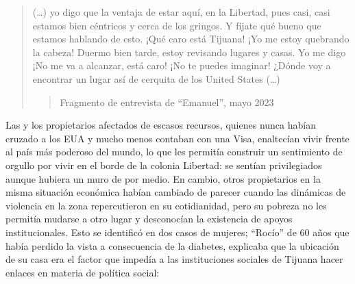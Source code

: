 \documentclass[
  spanish,
  11pt,
  a4paper,
]{scrbook}
\begin{document}
\begin{quote}
(\ldots) yo digo que la ventaja de estar aquí, en la Libertad, pues
casi, casi estamos bien céntricos y cerca de los gringos. Y fíjate qué
bueno que estamos hablando de esto. ¡Qué caro está Tijuana! ¡Yo me estoy
quebrando la cabeza! Duermo bien tarde, estoy revisando lugares y casas.
Yo me digo ¡No me va a alcanzar, está caro! ¡No te puedes imaginar!
¿Dónde voy a encontrar un lugar así de cerquita de los United States
(\ldots)

\begin{quote}
Fragmento de entrevista de ``Emanuel'', mayo 2023
\end{quote}
\end{quote}

Las y los propietarios afectados de escasos recursos, quienes nunca
habían cruzado a los EUA y mucho menos contaban con una Visa, enaltecían
vivir frente al país más poderoso del mundo, lo que les permitía
construir un sentimiento de orgullo por vivir en el borde de la colonia
Libertad: se sentían privilegiados aunque hubiera un muro de por medio.
En cambio, otros propietarios en la misma situación económica habían
cambiado de parecer cuando las dinámicas de violencia en la zona
repercutieron en su cotidianidad, pero su pobreza no les permitía
mudarse a otro lugar y desconocían la existencia de apoyos
institucionales. Esto se identificó en dos casos de mujeres; ``Rocío''
de 60 años que había perdido la vista a consecuencia de la diabetes,
explicaba que la ubicación de su casa era el factor que impedía a las
instituciones sociales de Tijuana hacer enlaces en materia de política
social:
\end{document}
